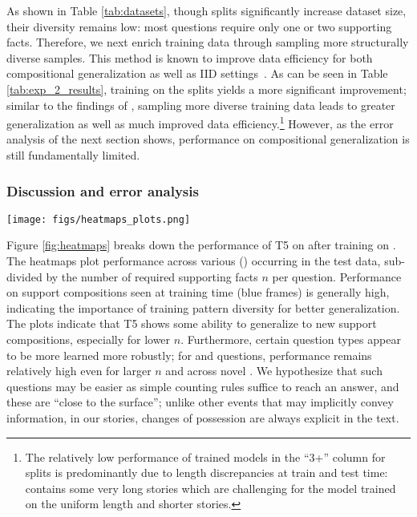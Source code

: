 As shown in Table \ref{tab:datasets}, though \injectnarg splits significantly increase dataset size, their diversity remains low: most questions require only one or two supporting facts. Therefore, we next enrich training data through sampling more structurally diverse samples. This method is known to improve data efficiency for both compositional generalization as well as IID settings~\citep{oren2021finding}. As can be seen in Table \ref{tab:exp_2_results}, training on the \diversenarg splits yields a more significant improvement; similar to the findings of \citet{oren2021finding}, sampling more diverse training data leads to greater generalization as well as much improved data efficiency.\footnote{The relatively low performance of \diversenarg trained models in the ``3+'' column for \concatnarg splits is predominantly due to length discrepancies at train and test time: \concatnarg contains some very long stories which are challenging for the model trained on the uniform length and shorter \diversenarg stories.} However, as the error analysis of the next section shows, performance on compositional generalization is still fundamentally limited.








\subsubsection*{Discussion and error analysis} 
\label{ssec:exp_2_err_analysis}

\begin{figure*}[t!]
\centering
\texttt{[image: figs/heatmaps\_plots.png]}
\caption{\label{fig:heatmaps} Error analysis on  for T5 trained on  data.  Performance on support compositions seen at training time (blue frames) is generally high, but overall generalization is not systematic, as evidenced by high variance across different \suppcomp, especially for higher complexity and more novel compositions.}
\end{figure*}

Figure \ref{fig:heatmaps} breaks down the performance of T5 on  after training on . The heatmaps plot performance across various \reasonpat (\suppcomp) occurring in the test data, sub-divided by the number of required supporting facts $n$ per question. Performance on support compositions seen at training time (blue frames) is generally high, indicating the importance of training pattern diversity for better generalization.
The plots indicate that T5 shows some ability to generalize to new support compositions, especially for lower $n$. Furthermore, certain question types appear to be more learned more robustly; for \listq and \countq questions, performance remains relatively high even for larger $n$ and across novel \suppcomp. We hypothesize that such questions may be easier as simple counting rules suffice to reach an answer, and these are ``close to the surface''; unlike other events that may implicitly convey information, in our stories, changes of possession are always explicit in the text. 

